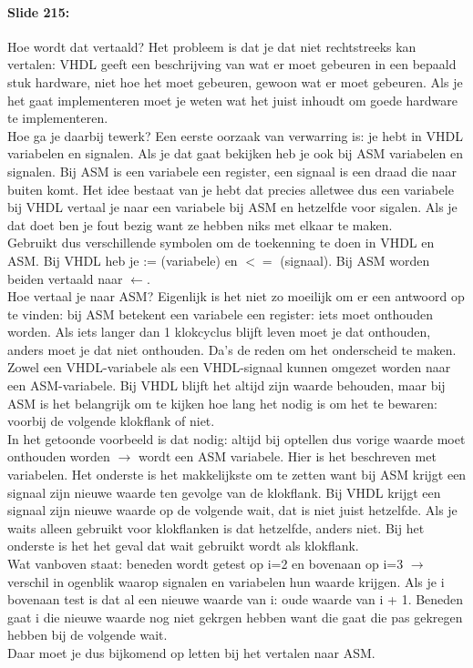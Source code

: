 \documentclass[10pt,a4paper]{book}
\begin{document}
\paragraph{Slide 215:} Hoe wordt dat vertaald? Het probleem is dat je dat niet rechtstreeks kan vertalen: VHDL geeft een beschrijving van wat er moet gebeuren in een bepaald stuk hardware, niet hoe het moet gebeuren, gewoon wat er moet gebeuren. Als je het gaat implementeren moet je weten wat het juist inhoudt om goede hardware te implementeren.\\
Hoe ga je daarbij tewerk? Een eerste oorzaak van verwarring is: je hebt in VHDL variabelen en signalen. Als je dat gaat bekijken heb je ook bij ASM variabelen en signalen. Bij ASM is een variabele een register, een signaal is een draad die naar buiten komt. Het idee bestaat van je hebt dat precies alletwee dus een variabele bij VHDL vertaal je naar een variabele bij ASM en hetzelfde voor sigalen. Als je dat doet ben je fout bezig want ze hebben niks met elkaar te maken.\\
Gebruikt dus verschillende symbolen om de toekenning te doen in VHDL en ASM. Bij VHDL heb je := (variabele) en $<=$ (signaal). Bij ASM worden beiden vertaald naar $\leftarrow$.\\ 
Hoe vertaal je naar ASM? Eigenlijk is het niet zo moeilijk om er een antwoord op te vinden: bij ASM betekent een variabele een register: iets moet onthouden worden. Als iets langer dan 1 klokcyclus blijft leven moet je dat onthouden, anders moet je dat niet onthouden. Da's de reden om het onderscheid te maken. Zowel een VHDL-variabele als een VHDL-signaal kunnen omgezet worden naar een ASM-variabele. Bij VHDL blijft het altijd zijn waarde behouden, maar bij ASM is het belangrijk om te kijken hoe lang het nodig is om het te bewaren: voorbij de volgende klokflank of niet.\\
In het getoonde voorbeeld is dat nodig: altijd bij optellen dus vorige waarde moet onthouden worden $\rightarrow$ wordt een ASM variabele. Hier is het beschreven met variabelen. Het onderste is het makkelijkste om te zetten want bij ASM krijgt een signaal zijn nieuwe waarde ten gevolge van de klokflank. Bij VHDL krijgt een signaal zijn nieuwe waarde op de volgende wait, dat is niet juist hetzelfde. Als je waits alleen gebruikt voor klokflanken is dat hetzelfde, anders niet. Bij het onderste is het het geval dat wait gebruikt wordt als klokflank.\\
Wat vanboven staat: beneden wordt getest op i=2 en bovenaan op i=3 $\rightarrow$ verschil in ogenblik waarop signalen en variabelen hun waarde krijgen. Als je i bovenaan test is dat al een nieuwe waarde van i: oude waarde van i + 1. Beneden gaat i die nieuwe waarde nog niet gekrgen hebben want die gaat die pas gekregen hebben bij de volgende wait.\\
Daar moet je dus bijkomend op letten bij het vertalen naar ASM.
\end{document}
